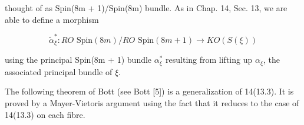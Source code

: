 thought of as Spin(8m + 1)/Spin(8m) bundle. As in Chap. 14, Sec. 13, we are able to define a morphism

$$\tilde{\alpha}^*_{\xi} : RO \text{ Spin}(8m)/RO \text{ Spin}(8m + 1) \rightarrow KO(S(\xi))$$

using the principal Spin(8m + 1) bundle $\alpha^*_{\xi}$ resulting from lifting up $\alpha_{\xi}$, the associated principal bundle of $\xi$.

The following theorem of Bott (see Bott [5]) is a generalization of 14(13.3). It is proved by a Mayer-Vietoris argument using the fact that it reduces to the case of 14(13.3) on each fibre.
